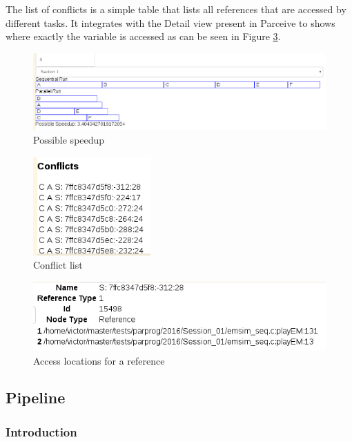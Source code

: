 The list of conflicts is a simple table that lists all references that are accessed by different tasks. It integrates with the Detail view present in Parceive to shows where exactly the variable is accessed as can be seen in Figure \ref{cap3:sec:detail}.

\begin{figure}
	\centering
	\includegraphics[width=1\textwidth]{section-speedup}
	\caption{Possible speedup}
	\label{cap3:sec:speedup}
\end{figure}

\begin{figure}
	\centering
	\includegraphics[width=0.4\textwidth]{section-conflict}
	\caption{Conflict list}
	\label{cap3:sec:conflict}
\end{figure}

\begin{figure}
	\centering
	\includegraphics[width=1\textwidth]{section-detail}
	\caption{Access locations for a reference}
	\label{cap3:sec:detail}
\end{figure}

\subsection{Pipeline}
\subsubsection{Introduction}
